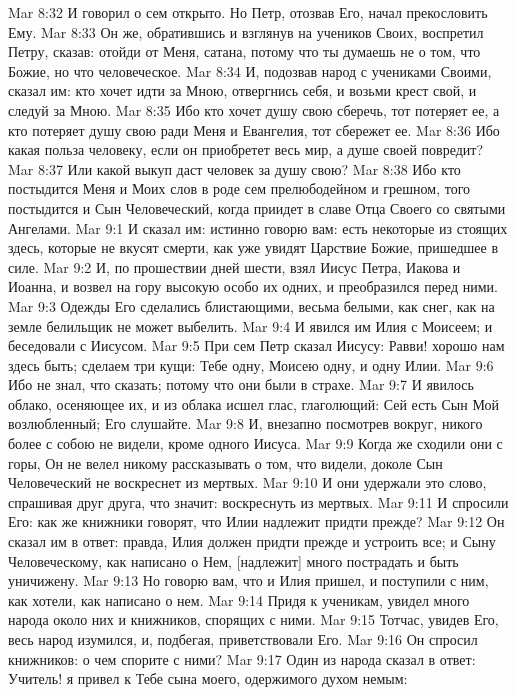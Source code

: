 Mar 8:32  И говорил о сем открыто. Но Петр, отозвав Его, начал прекословить Ему.
Mar 8:33  Он же, обратившись и взглянув на учеников Своих, воспретил Петру, сказав: отойди от Меня, сатана, потому что ты думаешь не о том, что Божие, но что человеческое.
Mar 8:34  И, подозвав народ с учениками Своими, сказал им: кто хочет идти за Мною, отвергнись себя, и возьми крест свой, и следуй за Мною.
Mar 8:35  Ибо кто хочет душу свою сберечь, тот потеряет ее, а кто потеряет душу свою ради Меня и Евангелия, тот сбережет ее.
Mar 8:36  Ибо какая польза человеку, если он приобретет весь мир, а душе своей повредит?
Mar 8:37  Или какой выкуп даст человек за душу свою?
Mar 8:38  Ибо кто постыдится Меня и Моих слов в роде сем прелюбодейном и грешном, того постыдится и Сын Человеческий, когда приидет в славе Отца Своего со святыми Ангелами.
Mar 9:1  И сказал им: истинно говорю вам: есть некоторые из стоящих здесь, которые не вкусят смерти, как уже увидят Царствие Божие, пришедшее в силе.
Mar 9:2  И, по прошествии дней шести, взял Иисус Петра, Иакова и Иоанна, и возвел на гору высокую особо их одних, и преобразился перед ними.
Mar 9:3  Одежды Его сделались блистающими, весьма белыми, как снег, как на земле белильщик не может выбелить.
Mar 9:4  И явился им Илия с Моисеем; и беседовали с Иисусом.
Mar 9:5  При сем Петр сказал Иисусу: Равви! хорошо нам здесь быть; сделаем три кущи: Тебе одну, Моисею одну, и одну Илии.
Mar 9:6  Ибо не знал, что сказать; потому что они были в страхе.
Mar 9:7  И явилось облако, осеняющее их, и из облака исшел глас, глаголющий: Сей есть Сын Мой возлюбленный; Его слушайте.
Mar 9:8  И, внезапно посмотрев вокруг, никого более с собою не видели, кроме одного Иисуса.
Mar 9:9  Когда же сходили они с горы, Он не велел никому рассказывать о том, что видели, доколе Сын Человеческий не воскреснет из мертвых.
Mar 9:10  И они удержали это слово, спрашивая друг друга, что значит: воскреснуть из мертвых.
Mar 9:11  И спросили Его: как же книжники говорят, что Илии надлежит придти прежде?
Mar 9:12  Он сказал им в ответ: правда, Илия должен придти прежде и устроить все; и Сыну Человеческому, как написано о Нем, [надлежит] много пострадать и быть уничижену.
Mar 9:13  Но говорю вам, что и Илия пришел, и поступили с ним, как хотели, как написано о нем.
Mar 9:14  Придя к ученикам, увидел много народа около них и книжников, спорящих с ними.
Mar 9:15  Тотчас, увидев Его, весь народ изумился, и, подбегая, приветствовали Его.
Mar 9:16  Он спросил книжников: о чем спорите с ними?
Mar 9:17  Один из народа сказал в ответ: Учитель! я привел к Тебе сына моего, одержимого духом немым:
